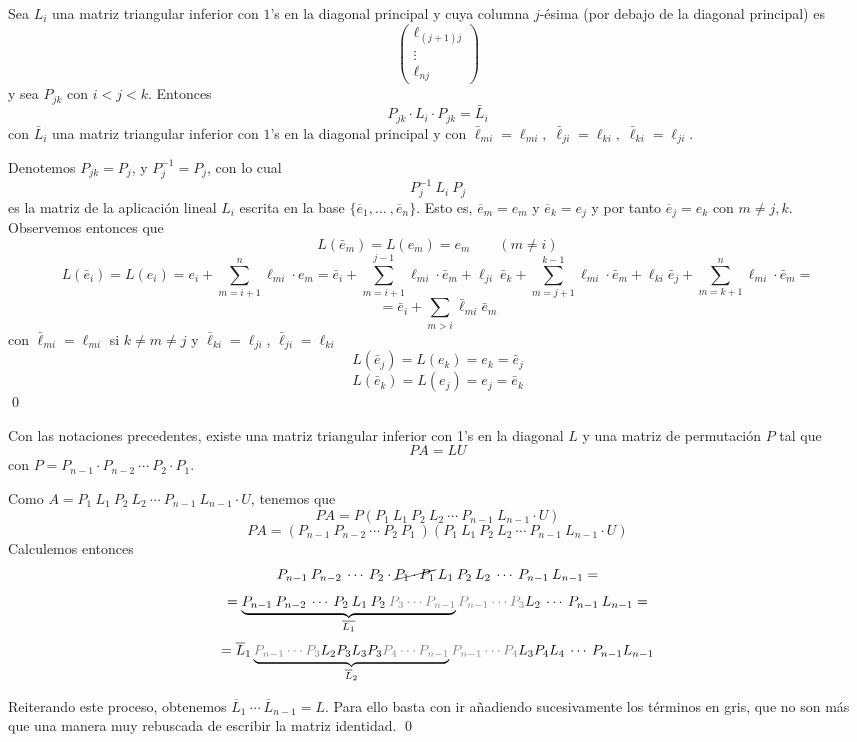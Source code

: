 \begin{lem}
Sea $L_i$ una matriz triangular inferior con $1$'s en la diagonal principal  y cuya columna $j$-ésima (por debajo de la diagonal principal) es 
$$\begin{pmatrix}
    \ell_{(j+1)j} \\
    \vdots \\
    \ell_{nj}
\end{pmatrix}$$ 
y sea $P_{jk}$ con $i<j<k$. Entonces
$$P_{jk}\cdot L_i\cdot P_{jk}=\bar{L}_i$$
con $\bar{L}_{i}$ una matriz triangular inferior con $1$'s en la diagonal principal y con $\bar{\ell}_{mi}=\ell_{mi},\; \bar{\ell}_{ji}=\ell_{ki}, \; \bar{\ell}_{ki}=\ell_{ji}$.
\end{lem}
\begin{dem} Denotemos $P_{jk}=P_j$, y $P_j^{-1}=P_j$, con lo cual
$$P_j^{-1} \: L_i \: P_j $$
es la matriz de la aplicación lineal $L_i$ escrita en la base $\{\overline{e}_1, \ldots \: , \overline{e}_n\}$. Esto es, $\overline{e}_m=e_m$ y $\overline{e}_k=e_j$ y por tanto $\overline{e}_j=e_k$ con $m \neq j , k$. Observemos entonces  que
$$L(\bar{e}_m)=L(e_m)=e_m\qquad (m\neq i)$$
$$L(\bar{e}_i)=L(e_i)=e_i+\sum_{m=i+1}^n\ell_{mi}\cdot e_m=\bar{e}_i+\sum_{m=i+1}^{j-1}\ell_{mi}\cdot \bar{e}_m + \ell_{ji} \: \bar{e}_k + \sum_{m=j+1}^{k-1}\ell_{mi}\cdot \bar{e}_m + \ell_{ki} \bar{e}_j + \sum_{m=k+1}^{n}\ell_{mi}\cdot \bar{e}_m=  $$
$$=\bar{e}_i+\sum_{m>i}\bar{\ell}_{mi}\bar{e}_m$$
    con $\bar{\ell}_{mi}={\ell}_{mi}$ si $k \neq m \neq j$ y $\bar{\ell}_{ki}={\ell}_{ji}$, $\bar{\ell}_{ji}={\ell}_{ki}$ 
  $$L(\bar{e}_j)=L(e_k)=e_k=\bar{e}_j$$
  $$L(\bar{e}_k)=L(e_j)=e_j=\bar{e}_k$$
\qed\end{dem}
\begin{teo}
    Con las notaciones precedentes, existe una matriz triangular inferior con 1's en la diagonal $L$ y una matriz de permutación $P$ tal que 
    $$PA=LU$$
    con $P=P_{n-1} \cdot P_{n-2} \: \cdots \: P_2 \cdot P_1$.
\end{teo}
\begin{dem}
Como $A=P_1 \: L_1 \: P_2 \: L_2 \: \cdots \: P_{n-1} \: L_{n-1} \cdot U$, tenemos que
$$PA=P(P_1 \: L_1 \: P_2 \: L_2 \: \cdots \: P_{n-1} \: L_{n-1} \cdot U)$$
$$PA=(P_{n-1} \: P_{n-2} \: \cdots \: P_{2} \:P_1\:)(P_1 \: L_1 \: P_2 \: L_2 \: \cdots \: P_{n-1} \: L_{n-1} \cdot U) $$
Calculemos entonces
$$P_{n-1} \: P_{n-2} \: \cdots \: P_{2} \cdot \cancel{P_1\cdot P_1} \: L_1 \: P_2 \: L_2 \: \cdots \: P_{n-1} \: L_{n-1}=$$
$$=\underbrace{P_{n-1} \: P_{n-2} \: \cdots \: P_{2} \: L_1 \: P_2 \:\textcolor{gray}{P_3 \cdots P_{n-1}}}_{\overline{{L}_1}} \textcolor{gray}{P_{n-1} \cdots P_3} L_2 \: \cdots \: P_{n-1} \: L_{n-1} = $$
$$=\overline{L}_1 \underbrace{\textcolor{gray}{P_{n-1} \cdots P_3} L_2 P_3 L_3 P_3 \textcolor{gray}{P_4 \cdots P_{n-1}}}_{\overline{L}_2} \textcolor{gray}{P_{n-1} \cdots P_4} L_3 P_4 L_4 \: \cdots \: P_{n-1} L_{n-1}  $$

Reiterando este proceso, obtenemos $\overline{L}_{1} \: \cdots \: \overline{L}_{n-1}=L$. Para ello basta con ir añadiendo sucesivamente  los términos en gris, que no son más que una manera muy rebuscada de escribir la matriz identidad.
\qed\end{dem}
